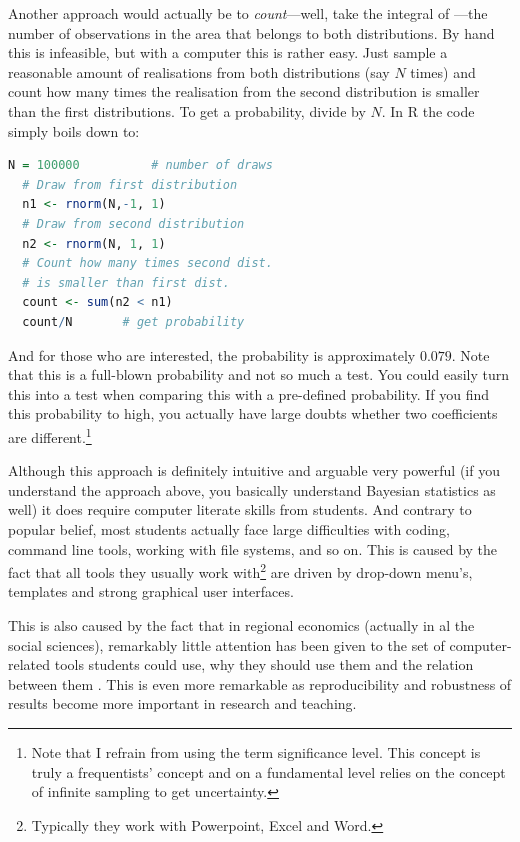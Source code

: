\documentclass[fleqn,10pt]{SelfArx} %
\begin{document}
Another approach would actually be to \emph{count}---well, take the integral of
---the number of observations in the area that belongs to both distributions. By
hand this is infeasible, but with a computer this is rather easy. Just sample a
reasonable amount of realisations from both distributions (say $N$ times) and
count how many times the realisation from the second distribution is smaller
than the first distributions. To get a probability, divide by $N$. In R the code
simply boils down to:

\begin{lstlisting}[language=R]
  N = 100000          # number of draws
  # Draw from first distribution
  n1 <- rnorm(N,-1, 1) 
  # Draw from second distribution
  n2 <- rnorm(N, 1, 1) 
  # Count how many times second dist.
  # is smaller than first dist.
  count <- sum(n2 < n1)    
  count/N       # get probability 
\end{lstlisting}
And for those who are interested, the probability is approximately $0.079$. Note
that this is a full-blown probability and not so much a test. You could easily
turn this into a test when comparing this with a pre-defined probability. If you
find this probability to high, you actually have large doubts whether two
coefficients are different.\footnote{Note that I refrain from using the term
  significance level. This concept is truly a frequentists' concept and on a
  fundamental level relies on the concept of infinite sampling to get uncertainty.} 

Although this approach is definitely intuitive and arguable very powerful (if
you understand the approach above, you basically understand Bayesian statistics
as well) it does require computer literate skills from students. And contrary to
popular belief, most students actually face large difficulties with coding,
command line tools, working with file systems, and so on. This is caused by the
fact that all tools they usually work with\footnote{Typically they work with Powerpoint, Excel
  and Word.} are driven by drop-down menu's,
templates and strong graphical user interfaces.  

This is also caused by the fact that in regional economics (actually in al the
social sciences), remarkably little attention has been given to the set of
computer-related tools students could use, why they should use them and the
relation between them \citep[with some exceptions as, amongst some others, by][]{Rey:2014cl,arribas2015woow, Arribas2016}.
This is even more remarkable as reproducibility and robustness of results become
more important in research and teaching. 
\end{document}
